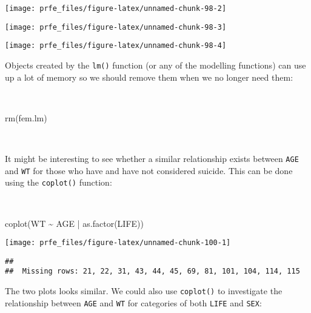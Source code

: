 \documentclass[
  12pt,
  a4paper]{book}
\newenvironment{Shaded}{\begin{snugshade}}{\end{snugshade}}
\newcommand{\FunctionTok}[1]{\textcolor[rgb]{0.00,0.00,0.00}{#1}}
\newcommand{\NormalTok}[1]{#1}
\newcommand{\SpecialCharTok}[1]{\textcolor[rgb]{0.00,0.00,0.00}{#1}}
\begin{document}
\begin{center}\texttt{[image: prfe\_files/figure-latex/unnamed-chunk-98-2]} \end{center}

\begin{center}\texttt{[image: prfe\_files/figure-latex/unnamed-chunk-98-3]} \end{center}

\begin{center}\texttt{[image: prfe\_files/figure-latex/unnamed-chunk-98-4]} \end{center}

\newpage

Objects created by the \texttt{lm()} function (or any of the modelling functions) can use up a lot of memory so we should remove them when we no longer need them:

~

\begin{Shaded}
\begin{Highlighting}[]
\FunctionTok{rm}\NormalTok{(fem.lm)}
\end{Highlighting}
\end{Shaded}

~

It might be interesting to see whether a similar relationship exists between \texttt{AGE} and \texttt{WT} for those who have and have not considered suicide. This can be done using the \texttt{coplot()} function:

~

\begin{Shaded}
\begin{Highlighting}[]
\FunctionTok{coplot}\NormalTok{(WT }\SpecialCharTok{\textasciitilde{}}\NormalTok{ AGE }\SpecialCharTok{|} \FunctionTok{as.factor}\NormalTok{(LIFE))}
\end{Highlighting}
\end{Shaded}

\begin{center}\texttt{[image: prfe\_files/figure-latex/unnamed-chunk-100-1]} \end{center}

\begin{verbatim}
## 
##  Missing rows: 21, 22, 31, 43, 44, 45, 69, 81, 101, 104, 114, 115
\end{verbatim}

\newpage

The two plots looks similar. We could also use \texttt{coplot()} to investigate the relationship between \texttt{AGE} and \texttt{WT} for categories of both \texttt{LIFE} and \texttt{SEX}:
\end{document}
